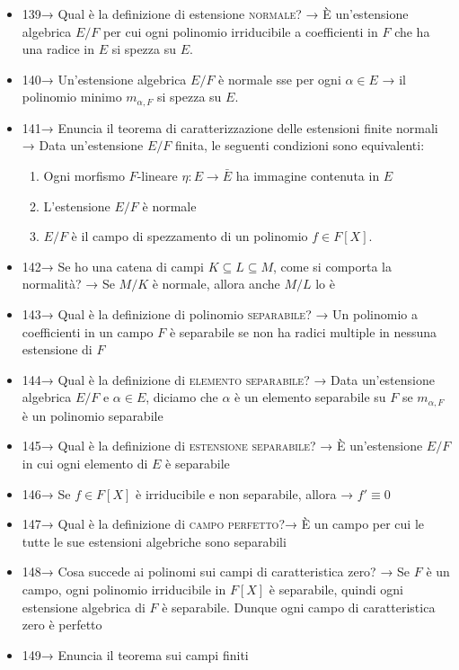\documentclass[A4,12pt]{article}
\renewcommand{\subset}{\subseteq}
\begin{document}
\begin{itemize}[noitemsep]
		\item 139→ Qual è la definizione di estensione \textsc{normale}? → È un'estensione algebrica $ E/F $ per cui ogni polinomio irriducibile a coefficienti in $ F $ che ha una radice in $ E $ si spezza su $ E $.
		\item 140→ Un'estensione algebrica $ E/F $ è normale sse per ogni $ \alpha \in E $ → il polinomio minimo $ m_{\alpha,F} $ si spezza su $ E $.
		\item 141→ Enuncia il teorema di caratterizzazione delle estensioni finite normali → Data un'estensione $ E/F $ finita, le seguenti condizioni sono equivalenti: \begin{enumerate}
			\item Ogni morfismo $ F $-lineare $ \eta:E\to \bar E $ ha immagine contenuta in $ E $
			\item L'estensione $ E/F $ è normale
			\item $ E/F $ è il campo di spezzamento di un polinomio $ f\in F[X] $.
		\end{enumerate}
		\item 142→ Se ho una catena di campi $ K\subset L\subset M $, come si comporta la normalità? → Se $ M/K $ è normale, allora anche $ M/L $ lo è
		\item 143→ Qual è la definizione di polinomio \textsc{separabile}? → Un polinomio a coefficienti in un campo $ F $ è separabile se non ha radici multiple in nessuna estensione di $ F $
		\item 144→ Qual è la definizione di \textsc{elemento separabile}? → Data un'estensione algebrica $ E/F $ e $ \alpha \in E $, diciamo che $ \alpha $ è un elemento separabile su $ F $ se $ m_{\alpha,F} $ è un polinomio separabile
		\item 145→ Qual è la definizione di \textsc{estensione separabile}? → È un'estensione $ E/F $ in cui ogni elemento di $ E $ è separabile
		\item 146→ Se $ f\in F[X] $ è irriducibile e non separabile, allora → $ f'\equiv 0 $
		\item 147→ Qual è la definizione di \textsc{campo perfetto}?→ È un campo per cui le tutte le sue estensioni algebriche sono separabili
		\item 148→ Cosa succede ai polinomi sui campi di caratteristica zero? → Se $ F $ è un campo, ogni polinomio irriducibile in $ F[X] $ è separabile, quindi ogni estensione algebrica di $ F $ è separabile. Dunque ogni campo di caratteristica zero è perfetto
		\item 149→ Enuncia il teorema sui campi finiti \begin{enumerate}

\end{enumerate}
\end{itemize}
\end{document}
